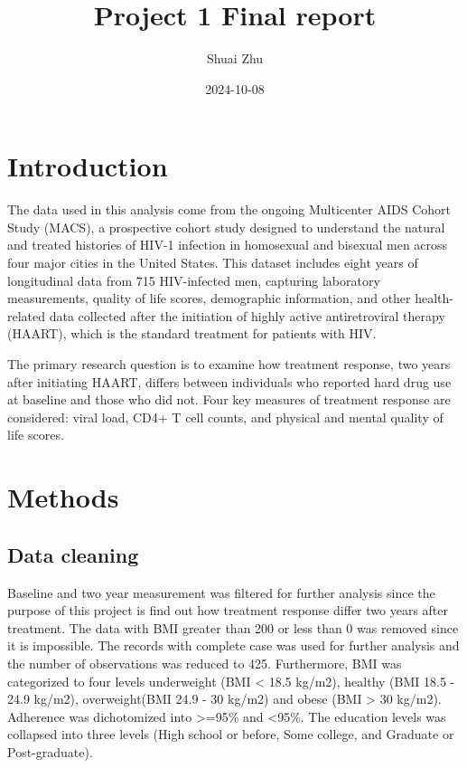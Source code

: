 \documentclass[
  12pt,
]{article}
\title{Project 1 Final report}
\author{Shuai Zhu}
\date{2024-10-08}
\begin{document}
\maketitle

\hypertarget{introduction}{%
\section{Introduction}\label{introduction}}

The data used in this analysis come from the ongoing Multicenter AIDS
Cohort Study (MACS), a prospective cohort study designed to understand
the natural and treated histories of HIV-1 infection in homosexual and
bisexual men across four major cities in the United States. This dataset
includes eight years of longitudinal data from 715 HIV-infected men,
capturing laboratory measurements, quality of life scores, demographic
information, and other health-related data collected after the
initiation of highly active antiretroviral therapy (HAART), which is the
standard treatment for patients with HIV.

The primary research question is to examine how treatment response, two
years after initiating HAART, differs between individuals who reported
hard drug use at baseline and those who did not. Four key measures of
treatment response are considered: viral load, CD4+ T cell counts, and
physical and mental quality of life scores.

\hypertarget{methods}{%
\section{Methods}\label{methods}}

\hypertarget{data-cleaning}{%
\subsection{Data cleaning}\label{data-cleaning}}

Baseline and two year measurement was filtered for further analysis
since the purpose of this project is find out how treatment response
differ two years after treatment. The data with BMI greater than 200 or
less than 0 was removed since it is impossible. The records with
complete case was used for further analysis and the number of
observations was reduced to 425. Furthermore, BMI was categorized to
four levels underweight (BMI \textless{} 18.5 kg/m2), healthy (BMI 18.5
- 24.9 kg/m2), overweight(BMI 24.9 - 30 kg/m2) and obese (BMI
\textgreater{} 30 kg/m2). Adherence was dichotomized into
\textgreater=95\% and \textless95\%. The education levels was collapsed
into three levels (High school or before, Some college, and Graduate or
Post-graduate).
\end{document}
